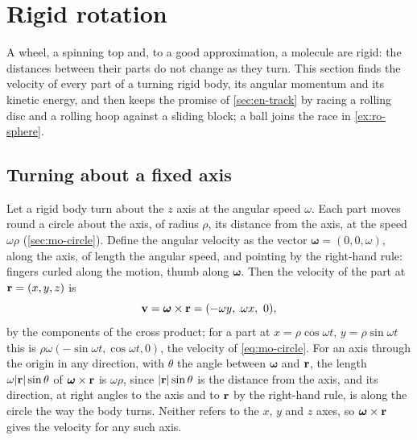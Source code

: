 \section{Rigid rotation}
\label{sec:ro-rigid}

A wheel, a spinning top and, to a good approximation, a molecule are rigid:
the distances between their parts do not change as they turn. This section
finds the velocity of every part of a turning rigid body, its angular
momentum and its kinetic energy, and then keeps the promise of
\cref{sec:en-track} by racing a rolling disc and a rolling hoop against a sliding block; a
ball joins the race in \cref{ex:ro-sphere}.

\subsection*{Turning about a fixed axis}

Let a rigid body turn about the $z$ axis at the angular speed $\omega$.
Each part moves round a circle about the axis, of radius $\rho$, its
distance from the axis, at the speed $\omega\rho$ (\cref{sec:mo-circle}).
Define the angular velocity as the vector $\boldsymbol{\omega} = (0, 0,
\omega)$, along the axis, of length the angular speed, and pointing by the
right-hand rule: fingers curled along the motion, thumb along
$\boldsymbol{\omega}$. Then the velocity of the part at $\bm{\mathrm{r}} = (x, y,
z)$ is
\begin{equation}
   \bm{\mathrm{v}} = \boldsymbol{\omega}\times\bm{\mathrm{r}} = (-\omega y,\ \omega x,\ 0) ,
   \label{eq:ro-rigid}
\end{equation}
by the components of the cross product; for a part at $x = \rho\cos
\omega t$, $y = \rho\sin\omega t$ this is $\rho\omega(-\sin\omega t, \cos
\omega t, 0)$, the velocity of \cref{eq:mo-circle}. For an axis
through the origin in any direction, with $\theta$ the angle between
$\boldsymbol{\omega}$ and $\bm{\mathrm{r}}$, the length $\omega\lvert\bm{\mathrm{r}}\rvert
\sin\theta$ of $\boldsymbol{\omega}\times\bm{\mathrm{r}}$ is $\omega\rho$, since
$\lvert\bm{\mathrm{r}}\rvert\sin\theta$ is the distance from the axis, and its
direction, at right angles to the axis and to $\bm{\mathrm{r}}$ by the right-hand
rule, is along the circle the way the body turns. Neither refers to the
$x$, $y$ and $z$ axes, so $\boldsymbol{\omega}\times\bm{\mathrm{r}}$ gives the
velocity for any such axis.


